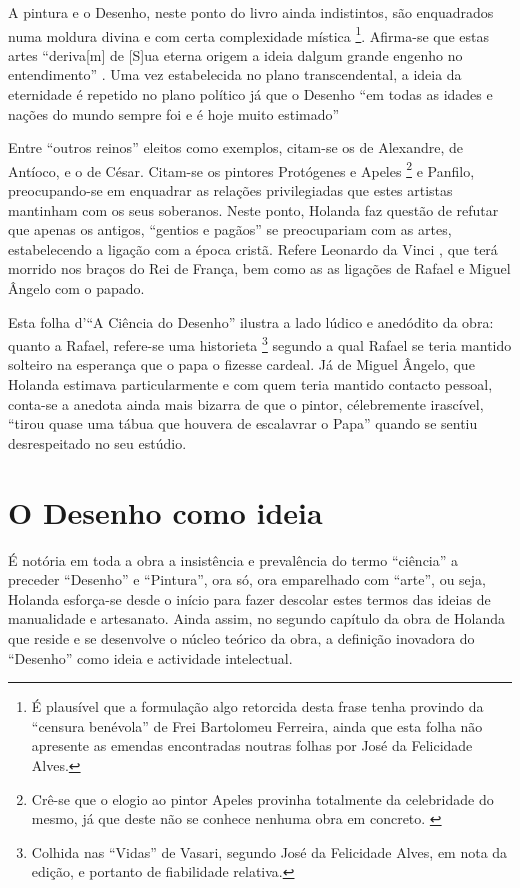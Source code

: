 \documentclass{article}
\begin{document}
A pintura e o Desenho, neste ponto do livro ainda indistintos, são
enquadrados numa moldura divina e com certa complexidade
mística \footnote{É plausível que a formulação algo retorcida desta
  frase tenha provindo da ``censura benévola'' de Frei Bartolomeu
  Ferreira, ainda que esta folha não apresente as emendas encontradas
  noutras folhas por José da Felicidade Alves.}. Afirma-se que estas
artes ``deriva[m] de [S]ua eterna origem a ideia dalgum grande engenho
no entendimento'' \cite[fl.34r]{holanda}. Uma vez estabelecida no
plano transcendental, a ideia da eternidade é repetido no plano
político já que o Desenho ``em todas as idades e nações do mundo
sempre foi e é hoje muito estimado'' \cite[fl.34r]{holanda}

Entre ``outros reinos'' eleitos como exemplos, citam-se os de
Alexandre, de Antíoco, e o de César. Citam-se os pintores Protógenes e
Apeles \footnote{Crê-se que o elogio ao pintor Apeles provinha
  totalmente da celebridade do mesmo, já que deste não se conhece
  nenhuma obra em concreto. \cite{calado}} e Panfilo, preocupando-se
em enquadrar as relações privilegiadas que estes artistas mantinham
com os seus soberanos. Neste ponto, Holanda faz questão de refutar que
apenas os antigos, ``gentios e pagãos'' se preocupariam com as artes,
estabelecendo a ligação com a época cristã. Refere Leonardo da Vinci ,
que terá morrido nos braços do Rei de França, bem como as as ligações
de Rafael e Miguel Ângelo com o papado.

Esta folha d'``A Ciência do Desenho'' ilustra a lado lúdico e
anedódito da obra: quanto a Rafael, refere-se uma
historieta \footnote{Colhida nas ``Vidas'' de Vasari, segundo José da
  Felicidade Alves, em nota da edição, e portanto de fiabilidade
  relativa. } segundo a qual Rafael se teria mantido solteiro na
esperança que o papa o fizesse cardeal. Já de Miguel Ângelo, que
Holanda estimava particularmente e com quem teria mantido contacto
pessoal, conta-se a anedota ainda mais bizarra de que o pintor,
célebremente irascível, ``tirou quase uma tábua que houvera de
escalavrar o Papa'' quando se sentiu desrespeitado no seu estúdio.

\section{O Desenho como ideia}

É notória em toda a obra a insistência e prevalência do termo
``ciência'' a preceder ``Desenho'' e ``Pintura'', ora só, ora
emparelhado com ``arte'', ou seja, Holanda esforça-se desde o início
para fazer descolar estes termos das ideias de manualidade e
artesanato. Ainda assim, no segundo capítulo da obra de Holanda que
reside e se desenvolve o núcleo teórico da obra, a definição inovadora
do ``Desenho'' como ideia e actividade intelectual.
\end{document}
